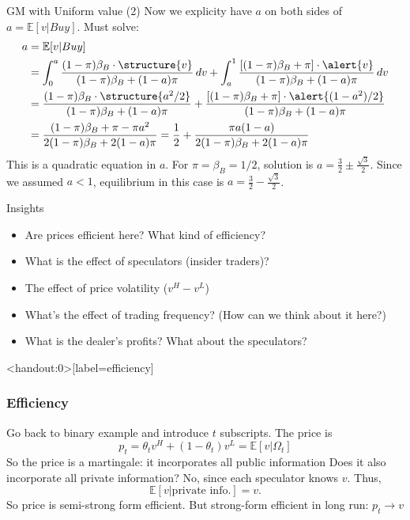 \documentclass[english,10pt]{beamer}
\begin{document}
\begin{frame}{GM with Uniform value (2)}
	Now we explicity have $a$ on both sides of $a=\mathbb{E}[v|Buy]$. Must solve:
	\begin{align*}
	a 
	& = \mathbb{E}[v|Buy] \\
	& = \int^{a}_0 \frac{(1-\pi) \beta_B \cdot \structure{v}}{(1-\pi)\beta_B + (1-a) \pi} \, dv + \int^{1}_{a} \frac{[(1-\pi) \beta_B + \pi] \cdot \alert{v}}{(1-\pi)\beta_B + (1-a) \pi} \, dv \\
	& =  \frac{(1-\pi) \beta_B \cdot \structure{a^2/2}}{(1-\pi)\beta_B + (1-a) \pi}+  \frac{[(1-\pi) \beta_B + \pi] \cdot \alert{(1-a^2)/2}}{(1-\pi)\beta_B + (1-a) \pi} \\
	& =  \frac{(1-\pi) \beta_B + \pi -\pi a^2}{2(1-\pi)\beta_B + 2(1-a) \pi} = \frac{1}{2} + \frac{\pi a (1 - a)}{2(1-\pi)\beta_B + 2(1-a) \pi}
	\end{align*}
	This is a quadratic equation in $a$. For $\pi=\beta_B=1/2$, solution is $a=\frac{3}{2} \pm \frac{\sqrt{3}}{2}$. Since we assumed $a<1$, equilibrium in this case  is $a=\frac{3}{2} - \frac{\sqrt{3}}{2}$.
\end{frame}


\begin{frame}[label=insights]{Insights}
	\begin{itemize}
		\item Are prices efficient here? What kind of efficiency?
		\hyperlink{efficiency}{}
		\item What is the effect of speculators (insider traders)?
		\hyperlink{insiders}{}
		\item The effect of price volatility ($v^H - v^L$)
		\hyperlink{volatility}{}
		\item What's the effect of trading frequency? (How can we think about it here?)
		\hyperlink{frequency}{}
		\item What is the dealer's profits? What about the speculators?
		\hyperlink{profits}{}
	\end{itemize}
\end{frame}


\begin{frame}<handout:0>[label=efficiency]
	\frametitle{Efficiency}
	Go back to binary example and introduce $t$ subscripts. The price is 
	\[
	p_{t} = \theta_{t} v^H + (1-\theta_{t} ) v^L = \mathbb{E}[v|\Omega_{t}]
	\]
	So the price is a martingale: it incorporates all public information
	\pause
	Does it also incorporate all private information?
	\pause
	No, since each speculator knows $v$. Thus, 
	\[
	\mathbb{E}[v|\text{private info.}]=v.
	\]
	So price is semi-strong form efficient. But strong-form efficient in long run: $p_t \rightarrow v$\quad 
	\hyperlink{insights}{}
\end{frame}
\end{document}
